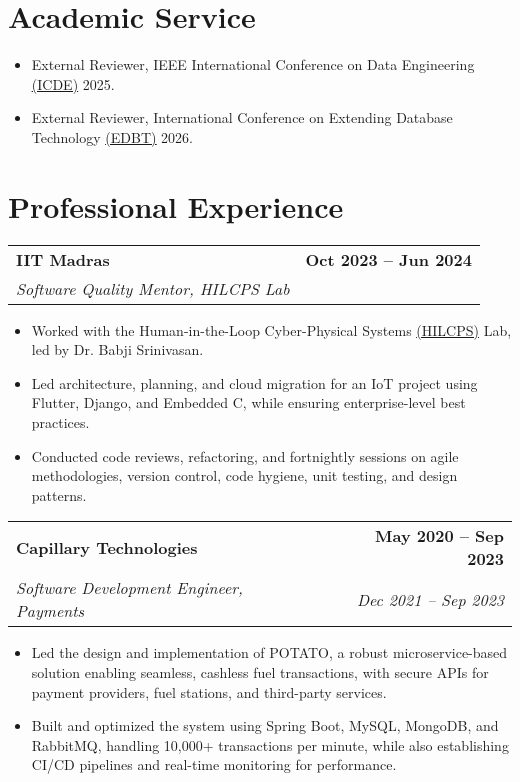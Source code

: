 \documentclass[letterpaper,11pt]{article}
\makeatletter
\newcommand{\resumeItem}[1]{
  \item\small{
    {#1 \vspace{-2pt}}
  }
}
\newcommand{\resumeSubheading}[4]{
  \vspace{-2pt}\item
    \begin{tabular*}{1.0\textwidth}[t]{l@{\extracolsep{\fill}}r}
      \textbf{#1} & \textbf{\small #2} \\
      \textit{\small#3} & \textit{\small #4} \\
    \end{tabular*}\vspace{-7pt}
}
\newcommand{\resumeItemListStart}{\begin{itemize}}
\newcommand{\resumeItemListEnd}{\end{itemize}\vspace{-5pt}}
\makeatother
\begin{document}
\vspace{-8pt}

\section{Academic Service}
    \resumeItemListStart
    \resumeItem{
        External Reviewer, IEEE International Conference on Data Engineering 
        \href{https://ieee-icde.org/2025/}{\underline{(ICDE)}} 2025.
    }
    \resumeItem{
        External Reviewer, International Conference on Extending Database Technology
        \href{https://edbticdt2026.github.io/}{\underline{(EDBT)}} 2026.
    }
    \resumeItemListEnd
\vspace{-8pt}

\section{Professional Experience}
    \resumeSubheading
      {IIT Madras}{Oct 2023 -- Jun 2024}
      {Software Quality Mentor, HILCPS Lab}{}
      \resumeItemListStart
        \resumeItem{Worked with the Human-in-the-Loop Cyber-Physical Systems 
        \href{https://home.iitm.ac.in/babji.srinivasan/index.html}{\underline{(HILCPS)}}
         Lab, led by Dr. Babji Srinivasan.
        }
        \resumeItem{Led architecture, planning, and cloud migration for an IoT project using Flutter, Django, and Embedded C, while ensuring enterprise-level best practices.
        }
        \resumeItem{Conducted code reviews, refactoring, and fortnightly sessions on agile methodologies, version control, code hygiene, unit testing, and design patterns.
        }
    \resumeItemListEnd

\pagebreak \vspace*{0pt}
    
    \resumeSubheading
      {Capillary Technologies}{May 2020 -- Sep 2023}
      {Software Development Engineer, Payments}{Dec 2021 -- Sep 2023}
      \resumeItemListStart
        \resumeItem{
        Led the design and implementation of POTATO, a robust microservice-based solution enabling seamless, cashless fuel transactions, with secure APIs for payment providers, fuel stations, and third-party services.
        }
        \resumeItem{
        Built and optimized the system using Spring Boot, MySQL, MongoDB, and RabbitMQ, handling 10,000+ transactions per minute, while also establishing CI/CD pipelines and real-time monitoring for performance.
        }
      \resumeItemListEnd
\end{document}
